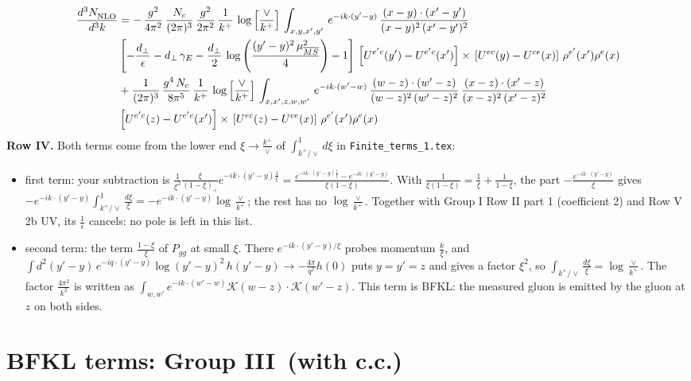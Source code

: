 \documentclass[9pt]{article}
\numberwithin{equation}{section}
\begin{document}
\begin{align}
\frac{d^{3}N_{\rm NLO}^{\rm}}{d^{3}k}  & = -\,\frac{g^{2}}{4\pi^{2}}\, \frac{N_{c}}{(2\pi)^{3}}\,\frac{g^{2}}{2\pi^{2}}\, \frac{1}{k^{+}}\,\log{\left[\frac{\vee}{k^{+}}\right]}\,\int_{x,y,x',y'}\,e^{-ik\cdot (y'-y)}\,\frac{(x-y)\cdot (x'-y')}{(x-y)^{2}\,(x'-y')^{2}}\notag \\
& \left[-\frac{d_{\perp}}{\epsilon}-d_{\perp}\,\gamma_{E}-\frac{d_{\perp}}{2}\,\log{\left(\frac{(y'-y)^{2}\,\mu^{2}_{\overline{MS}}}{4}\right)}-1\right]\,\left[U^{e'c}(y') - U^{e'c}(x')\right] \times\, \left[U^{ec}(y) - U^{ce}(x)\right]\, \rho^{e'}(x') \rho^{e}(x)\notag \\
& +\frac{1}{(2\pi)^{3}}\,\frac{g^{4}\,N_{c}}{8\pi^{5}}\,\frac{1}{k^{+}}\,\log{\left[\frac{\vee}{k^{+}}\right]}\,\int_{x,x',z,w,w'}\,e^{-ik\cdot (w'-w)}\,\frac{(w-z)\cdot(w'-z)}{(w-z)^{2}\,(w'-z)^{2}}\,\frac{(x-z)\cdot(x'-z)}{(x-z)^{2}\,(x'-z)^{2}}\notag \\
& \left[U^{e'c}(z) - U^{e'c}(x')\right] \times\, \left[U^{ec}(z) - U^{ce}(x)\right]\, \rho^{e'}(x') \rho^{e}(x)
\end{align}
\textbf{Row IV.} Both terms come from the lower end $\xi\to\frac{k^+}{\vee}$ of $\int_{k^+/\vee}^1d\xi$ in \texttt{Finite\_terms\_1.tex}:
\begin{itemize}
\item first term: your subtraction is $\frac{1}{\xi^2}\frac{\xi}{(1-\xi)_+}e^{-ik\cdot(y'-y)\frac1\xi}=\frac{e^{-ik\cdot(y'-y)\frac1\xi}-e^{-ik\cdot(y'-y)}}{\xi(1-\xi)}$. With $\frac{1}{\xi(1-\xi)}=\frac1\xi+\frac{1}{1-\xi}$, the part $-\frac{e^{-ik\cdot(y'-y)}}{\xi}$ gives $-e^{-ik\cdot(y'-y)}\int_{k^+/\vee}^1\frac{d\xi}{\xi}=-e^{-ik\cdot(y'-y)}\log\frac{\vee}{k^+}$; the rest has no $\log\frac{\vee}{k^+}$. Together with Group I Row II part 1 (coefficient 2) and Row V 2b UV, its $\frac1\epsilon$ cancels: no pole is left in this list.
\item second term: the term $\frac{1-\xi}{\xi}$ of $P_{gg}$ at small $\xi$. There $e^{-ik\cdot(y'-y)/\xi}$ probes momentum $\frac{k}{\xi}$, and $\int d^2(y'-y)\,e^{-iq\cdot(y'-y)}\log(y'-y)^2\,h(y'-y)\to-\frac{4\pi}{q^2}h(0)$ puts $y=y'=z$ and gives a factor $\xi^2$, so $\int_{k^+/\vee}\frac{d\xi}{\xi}=\log\frac{\vee}{k^+}$. The factor $\frac{4\pi^2}{k^2}$ is written as $\int_{w,w'}e^{-ik\cdot(w'-w)}\mathcal K(w-z)\cdot\mathcal K(w'-z)$. This term is BFKL: the measured gluon is emitted by the gluon at $z$ on both sides.
\end{itemize}

\section{BFKL terms: Group III\, (with c.c.)}
\end{document}
